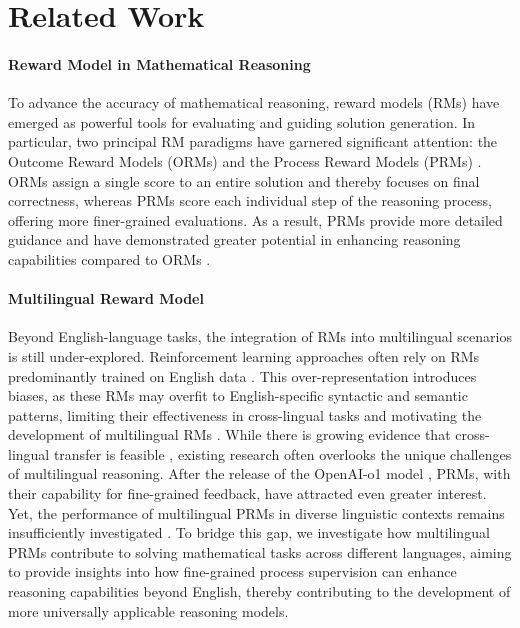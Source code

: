 \section{Related Work}
\label{sec:related_work}

\paragraph{Reward Model in Mathematical Reasoning}

To advance the accuracy of mathematical reasoning, reward models (RMs) have emerged as powerful tools for evaluating and guiding solution generation. In particular, two principal RM paradigms have garnered significant attention: the Outcome Reward Models (ORMs) \citep{orm1,orm2} and the Process Reward Models (PRMs) \citep{solving,prm800k,making,let,shepherd,improve,bugs,openr}. ORMs assign a single score to an entire solution and thereby focuses on final correctness, whereas PRMs score each individual step of the reasoning process, offering more finer-grained evaluations. As a result, PRMs provide more detailed guidance and have demonstrated greater potential in enhancing reasoning capabilities compared to ORMs \citep{prm800k,fine}.



\paragraph{Multilingual Reward Model}

Beyond English-language tasks, the integration of RMs into multilingual scenarios is still under-explored. 
Reinforcement learning approaches often rely on RMs predominantly trained on English data \citep{deepseek,qwen}. This over-representation introduces biases, as these RMs may overfit to English-specific syntactic and semantic patterns, limiting their effectiveness in cross-lingual tasks and motivating the development of multilingual RMs \citep{crossrm}. While there is growing evidence that cross-lingual transfer is feasible \citep{reuse,crossrm}, existing research often overlooks the unique challenges of multilingual reasoning.
After the release of the OpenAI-o1 model \citep{o1}, PRMs, with their capability for fine-grained feedback, have attracted even greater interest. Yet, the performance of multilingual PRMs in diverse linguistic contexts remains insufficiently investigated \citep{imbalance}. To bridge this gap, we investigate how multilingual PRMs contribute to solving mathematical tasks across different languages, aiming to provide insights into how fine-grained process supervision can enhance reasoning capabilities beyond English, thereby contributing to the development of more universally applicable reasoning models.